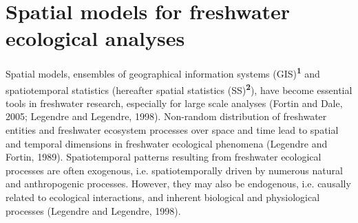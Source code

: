 \newpage

\section{Spatial models for freshwater ecological analyses}
\label{Spatial models for freshwater ecological analyses}

Spatial models, ensembles of geographical information systems (GIS)\textsuperscript{\textbf{1}} and spatiotemporal statistics (hereafter spatial statistics (SS)\textsuperscript{\textbf{2}}), have become essential tools in freshwater research, especially for large scale analyses (Fortin and Dale, 2005; Legendre and Legendre, 1998). Non-random distribution of freshwater entities and freshwater ecosystem processes over space and time lead to spatial and temporal dimensions in freshwater ecological phenomena (Legendre and Fortin, 1989). Spatiotemporal patterns resulting from freshwater ecological processes are often exogenous, i.e. spatiotemporally driven by numerous natural and anthropogenic processes. However, they may also be endogenous, i.e. causally related to ecological interactions, and inherent biological and physiological processes (Legendre and Legendre, 1998).

\bigskip

